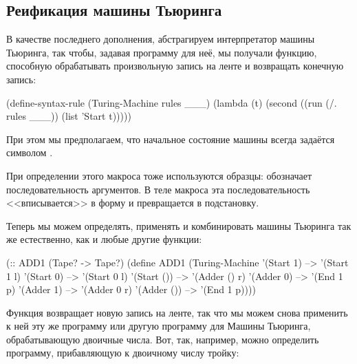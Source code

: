 \subsection*{Реификация машины Тьюринга}
В качестве последнего дополнения, абстрагируем интерпретатор машины Тьюринга, так чтобы, задавая программу для неё, мы получали функцию, способную обрабатывать произвольную запись на ленте и возвращать конечную запись:

\begin{Definition}[emph={l,rules}]
(define-syntax-rule (Turing-Machine rules ___)
  (lambda (t)
    (second ((run (/. rules ___)) (list 'Start t)))))
\end{Definition}

\noindent При этом мы предполагаем, что начальное состояние машины всегда задаётся символом . 

При определении этого макроса тоже используются образцы:  обозначает последовательность аргументов. В теле макроса эта последовательность <<вписывается>> в форму  и превращается в подстановку.

Теперь мы можем определять, применять и комбинировать машины Тьюринга так же естественно, как и любые другие функции:

\begin{SchemeCode}
(:: ADD1 (Tape? -> Tape?)
 (define ADD1
  (Turing-Machine
    '(Start 1) --> '(Start 1 l) 
    '(Start 0) --> '(Start 0 l) 
    '(Start ()) --> '(Adder () r) 
    '(Adder 0) --> '(End 1 p) 
    '(Adder 1) --> '(Adder 0 r) 
    '(Adder ()) --> '(End 1 p))))
\end{SchemeCode}
\vspace{-\medskipamount}
\vspace{-\medskipamount}
\vspace{-\medskipamount}
\vspace{-\medskipamount}
\vspace{-\medskipamount}
\vspace{-\medskipamount}
\vspace{-\medskipamount}


Функция  возвращает новую запись на ленте, так что мы можем снова применить к ней эту же программу или другую программу для Машины Тьюринга, обрабатывающую двоичные числа. Вот, так, например, можно определить программу, прибавляющую к двоичному числу тройку: 


